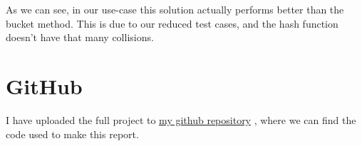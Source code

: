 \documentclass[a4paper,11pt]{article}
\newcommand{\underlinehref}[2]{%
    \href{#1}{\ul{#2}}%
}
\begin{document}
    As we can see, in our use-case this solution actually performs better than the bucket method.
    This is due to our reduced test cases, and the hash function doesn't have that many collisions.

    \section*{GitHub}
    I have uploaded the full project to \underlinehref{https://github.com/peterherczku/ID1021/tree/main/assignment-8}{my github repository}, where we can find the code used to make this report.
\end{document}
